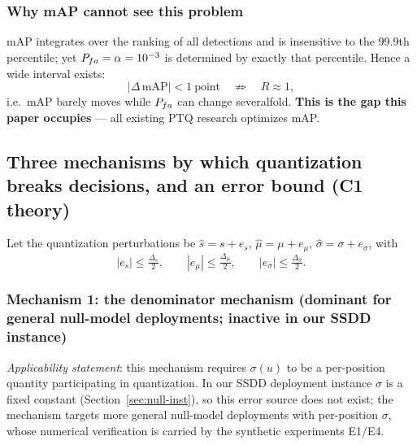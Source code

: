 \subsubsection{Why mAP cannot see this problem}
\label{sec:map-blind}

mAP integrates over the ranking of all detections and is insensitive to the 99.9th percentile; yet $P_{fa}=\alpha=10^{-3}$ is determined by exactly that percentile.
Hence a wide interval exists:
\begin{equation}
\big|\Delta\,\mathrm{mAP}\big|<1\ \text{point}\quad\not\Longrightarrow\quad R\approx 1 ,
\tag{3.10}
\label{eq:map-blind}
\end{equation}
i.e.\ mAP barely moves while $P_{fa}$ can change severalfold.
\textbf{This is the gap this paper occupies} --- all existing PTQ research optimizes mAP.

\subsection{Three mechanisms by which quantization breaks decisions, and an error bound (C1 theory)}
\label{sec:mechanisms}

Let the quantization perturbations be $\hat{s}=s+e_s$, $\hat{\mu}=\mu+e_\mu$, $\hat{\sigma}=\sigma+e_\sigma$, with
\begin{equation}
|e_s|\le\tfrac{\Delta_s}{2},\qquad |e_\mu|\le\tfrac{\Delta_\mu}{2},\qquad |e_\sigma|\le\tfrac{\Delta_\sigma}{2}.
\label{eq:errors}
\end{equation}

\subsubsection{Mechanism 1: the denominator mechanism (dominant for general null-model deployments; inactive in our SSDD instance)}
\label{sec:mech-denom}

\emph{Applicability statement}: this mechanism requires $\sigma(u)$ to be a per-position quantity participating in quantization.
In our SSDD deployment instance $\sigma$ is a fixed constant (Section~\ref{sec:null-inst}), so this error source does not exist; the mechanism targets more general null-model deployments with per-position $\sigma$, whose numerical verification is carried by the synthetic experiments E1/E4.

